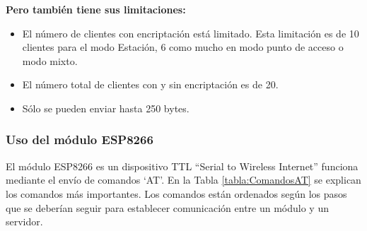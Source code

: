\textbf{Pero también tiene sus limitaciones:}
\begin{itemize}
\item El número de clientes con encriptación está limitado. Esta limitación es de 10 clientes para el modo Estación, 6 como mucho en modo punto de acceso o modo mixto.
\item El número total de clientes con y sin encriptación es de 20.
\item Sólo se pueden enviar hasta 250 bytes.
\end{itemize}

\subsubsection{Uso del módulo ESP8266}
El módulo ESP8266 \cite{tutorialESP} es un dispositivo TTL ``Serial to Wireless Internet'' funciona mediante el envío de comandos `AT'. En la Tabla \ref{tabla:ComandosAT} se explican los comandos más importantes. Los comandos están ordenados según los pasos que se deberían seguir para establecer comunicación entre un módulo y un servidor.

\clearpage

